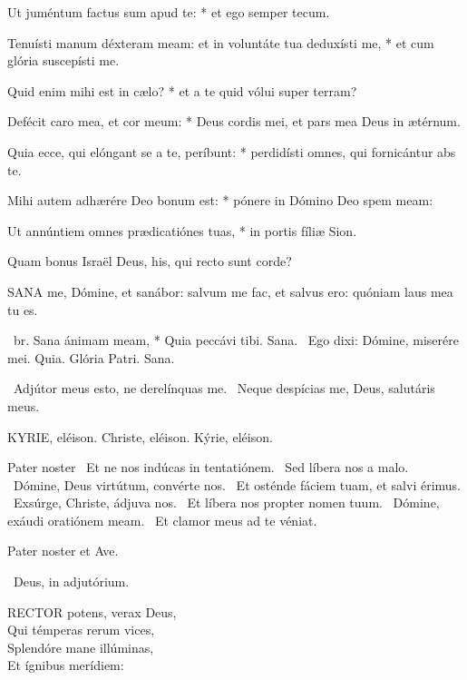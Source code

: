 Ut juméntum factus sum apud te: * et ego semper tecum.

Tenuísti manum déxteram meam: et in voluntáte tua deduxísti me, * et cum glória suscepísti me.

Quid enim mihi est in cælo? * et a te quid vólui super terram?

Defécit caro mea, et cor meum: * Deus cordis mei, et pars mea Deus in ætérnum.

Quia ecce, qui elóngant se a te, períbunt: * perdidísti omnes, qui fornicántur abs te.

Mihi autem adhærére Deo bonum est: * pónere in Dómino Deo spem meam:

Ut annúntiem omnes prædicatiónes tuas, * in portis fíliæ Sion.

 Quam bonus Israël Deus, his, qui recto sunt corde?



\lettrine[lines=2]{S}{ANA} me, Dómine, et sanábor: salvum me fac, et salvus ero: quóniam laus mea tu es.

\R\ br. Sana ánimam meam, * Quia peccávi tibi. Sana. \V\ Ego dixi: Dómine, miserére mei. Quia. Glória Patri. Sana.

\V\ Adjútor meus esto, ne derelínquas me. \R\ Neque despícias me, Deus, salutáris meus.



KYRIE, eléison. Christe, eléison. Kýrie, eléison.

Pater noster  \V\ Et ne nos indúcas in tentatiónem. \R\ Sed líbera nos a malo. \V\ Dómine, Deus virtútum, convérte nos. \R\ Et osténde fáciem tuam, et salvi érimus. \V\ Exsúrge, Christe, ádjuva nos. \R\ Et líbera nos propter nomen tuum. \V\ Dómine, exáudi oratiónem meam. \R\ Et clamor meus ad te véniat.



Pater noster et Ave.

\V\ Deus, in adjutórium.


\lettrine[lines=2]{R}{ECTOR} potens, verax Deus,\\
Qui témperas rerum vices,\\
Splendóre mane illúminas,\\
Et ígnibus merídiem:

